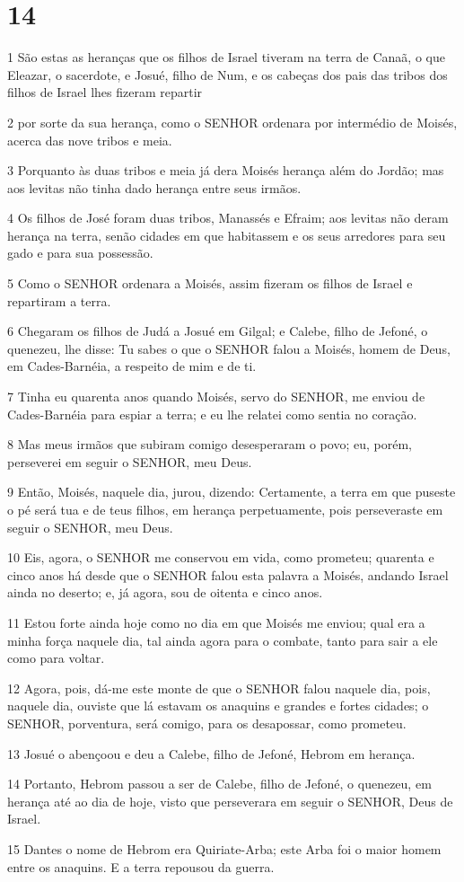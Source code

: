 \chapter{14}

\par 1 São estas as heranças que os filhos de Israel tiveram na terra de Canaã, o que Eleazar, o sacerdote, e Josué, filho de Num, e os cabeças dos pais das tribos dos filhos de Israel lhes fizeram repartir
\par 2 por sorte da sua herança, como o SENHOR ordenara por intermédio de Moisés, acerca das nove tribos e meia.
\par 3 Porquanto às duas tribos e meia já dera Moisés herança além do Jordão; mas aos levitas não tinha dado herança entre seus irmãos.
\par 4 Os filhos de José foram duas tribos, Manassés e Efraim; aos levitas não deram herança na terra, senão cidades em que habitassem e os seus arredores para seu gado e para sua possessão.
\par 5 Como o SENHOR ordenara a Moisés, assim fizeram os filhos de Israel e repartiram a terra.
\par 6 Chegaram os filhos de Judá a Josué em Gilgal; e Calebe, filho de Jefoné, o quenezeu, lhe disse: Tu sabes o que o SENHOR falou a Moisés, homem de Deus, em Cades-Barnéia, a respeito de mim e de ti.
\par 7 Tinha eu quarenta anos quando Moisés, servo do SENHOR, me enviou de Cades-Barnéia para espiar a terra; e eu lhe relatei como sentia no coração.
\par 8 Mas meus irmãos que subiram comigo desesperaram o povo; eu, porém, perseverei em seguir o SENHOR, meu Deus.
\par 9 Então, Moisés, naquele dia, jurou, dizendo: Certamente, a terra em que puseste o pé será tua e de teus filhos, em herança perpetuamente, pois perseveraste em seguir o SENHOR, meu Deus.
\par 10 Eis, agora, o SENHOR me conservou em vida, como prometeu; quarenta e cinco anos há desde que o SENHOR falou esta palavra a Moisés, andando Israel ainda no deserto; e, já agora, sou de oitenta e cinco anos.
\par 11 Estou forte ainda hoje como no dia em que Moisés me enviou; qual era a minha força naquele dia, tal ainda agora para o combate, tanto para sair a ele como para voltar.
\par 12 Agora, pois, dá-me este monte de que o SENHOR falou naquele dia, pois, naquele dia, ouviste que lá estavam os anaquins e grandes e fortes cidades; o SENHOR, porventura, será comigo, para os desapossar, como prometeu.
\par 13 Josué o abençoou e deu a Calebe, filho de Jefoné, Hebrom em herança.
\par 14 Portanto, Hebrom passou a ser de Calebe, filho de Jefoné, o quenezeu, em herança até ao dia de hoje, visto que perseverara em seguir o SENHOR, Deus de Israel.
\par 15 Dantes o nome de Hebrom era Quiriate-Arba; este Arba foi o maior homem entre os anaquins. E a terra repousou da guerra.

